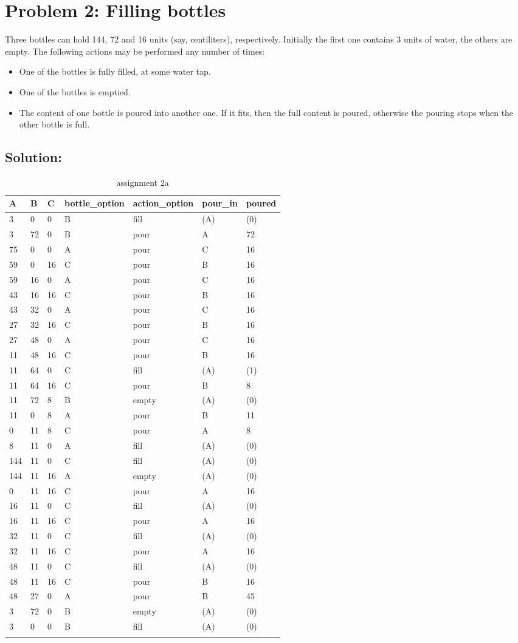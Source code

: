 \documentclass[a4paper]{article}
\begin{document}
	\section*{Problem 2: Filling bottles}
	Three bottles can hold 144, 72 and 16 units (say, centiliters), respectively. Initially the
first one contains 3 units of water, the others are empty. The following actions may be performed any number of times:
\begin{itemize}
\item One of the bottles is fully filled, at some water tap.
\item One of the bottles is emptied.
\item The content of one bottle is poured into another one. If it fits, then the full content
is poured, otherwise the pouring stops when the other bottle is full.
\end{itemize}

	\subsection*{Solution:}

	\begin{longtable}[c]{@{}lllllll@{}}
		\toprule
		A & B & C & bottle\_option & action\_option & pour\_in &
		poured\tabularnewline
		\midrule
		\endhead
		3 & 0 & 0 & B & fill & (A) & (0)\tabularnewline
		3 & 72 & 0 & B & pour & A & 72\tabularnewline
		75 & 0 & 0 & A & pour & C & 16\tabularnewline
		59 & 0 & 16 & C & pour & B & 16\tabularnewline
		59 & 16 & 0 & A & pour & C & 16\tabularnewline
		43 & 16 & 16 & C & pour & B & 16\tabularnewline
		43 & 32 & 0 & A & pour & C & 16\tabularnewline
		27 & 32 & 16 & C & pour & B & 16\tabularnewline
		27 & 48 & 0 & A & pour & C & 16\tabularnewline
		11 & 48 & 16 & C & pour & B & 16\tabularnewline
		11 & 64 & 0 & C & fill & (A) & (1)\tabularnewline
		11 & 64 & 16 & C & pour & B & 8\tabularnewline
		11 & 72 & 8 & B & empty & (A) & (0)\tabularnewline
		11 & 0 & 8 & A & pour & B & 11\tabularnewline
		0 & 11 & 8 & C & pour & A & 8\tabularnewline
		8 & 11 & 0 & A & fill & (A) & (0)\tabularnewline
		144 & 11 & 0 & C & fill & (A) & (0)\tabularnewline
		144 & 11 & 16 & A & empty & (A) & (0)\tabularnewline
		0 & 11 & 16 & C & pour & A & 16\tabularnewline
		16 & 11 & 0 & C & fill & (A) & (0)\tabularnewline
		16 & 11 & 16 & C & pour & A & 16\tabularnewline
		32 & 11 & 0 & C & fill & (A) & (0)\tabularnewline
		32 & 11 & 16 & C & pour & A & 16\tabularnewline
		48 & 11 & 0 & C & fill & (A) & (0)\tabularnewline
		48 & 11 & 16 & C & pour & B & 16\tabularnewline
		48 & 27 & 0 & A & pour & B & 45\tabularnewline
		3 & 72 & 0 & B & empty & (A) & (0)\tabularnewline
		3 & 0 & 0 & B & fill & (A) & (0)\tabularnewline
		\bottomrule
		\caption{assignment 2a}
		\label{tab:2a}
	\end{longtable}
	
\end{document}
